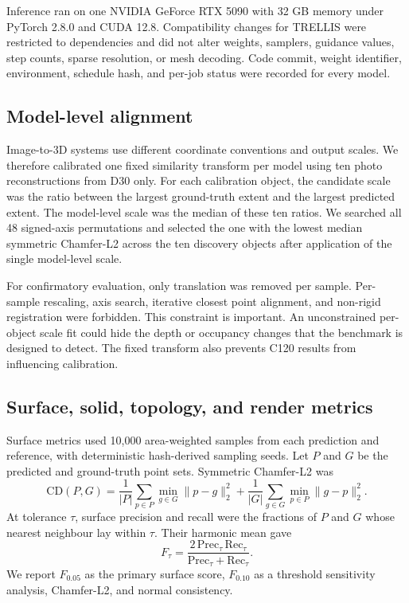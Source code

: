 \documentclass[12pt,a4paper]{article}
\begin{document}
Inference ran on one NVIDIA GeForce RTX 5090 with 32 GB memory under PyTorch 2.8.0 and CUDA 12.8. Compatibility changes for TRELLIS were restricted to dependencies and did not alter weights, samplers, guidance values, step counts, sparse resolution, or mesh decoding. Code commit, weight identifier, environment, schedule hash, and per-job status were recorded for every model.

\subsection{Model-level alignment}

Image-to-3D systems use different coordinate conventions and output scales. We therefore calibrated one fixed similarity transform per model using ten photo reconstructions from D30 only. For each calibration object, the candidate scale was the ratio between the largest ground-truth extent and the largest predicted extent. The model-level scale was the median of these ten ratios. We searched all 48 signed-axis permutations and selected the one with the lowest median symmetric Chamfer-L2 across the ten discovery objects after application of the single model-level scale.

For confirmatory evaluation, only translation was removed per sample. Per-sample rescaling, axis search, iterative closest point alignment, and non-rigid registration were forbidden. This constraint is important. An unconstrained per-object scale fit could hide the depth or occupancy changes that the benchmark is designed to detect. The fixed transform also prevents C120 results from influencing calibration.

\subsection{Surface, solid, topology, and render metrics}

Surface metrics used 10,000 area-weighted samples from each prediction and reference, with deterministic hash-derived sampling seeds. Let $P$ and $G$ be the predicted and ground-truth point sets. Symmetric Chamfer-L2 was
\begin{equation}
\mathrm{CD}(P,G)
=
\frac{1}{|P|}\sum_{p\in P}\min_{g\in G}\|p-g\|_2^2
+
\frac{1}{|G|}\sum_{g\in G}\min_{p\in P}\|g-p\|_2^2.
\label{eq:chamfer}
\end{equation}
At tolerance $\tau$, surface precision and recall were the fractions of $P$ and $G$ whose nearest neighbour lay within $\tau$. Their harmonic mean gave
\begin{equation}
F_{\tau}
=
\frac{2\,\mathrm{Prec}_{\tau}\,\mathrm{Rec}_{\tau}}
{\mathrm{Prec}_{\tau}+\mathrm{Rec}_{\tau}}.
\label{eq:fscore}
\end{equation}
We report $F_{0.05}$ as the primary surface score, $F_{0.10}$ as a threshold sensitivity analysis, Chamfer-L2, and normal consistency.
\end{document}

